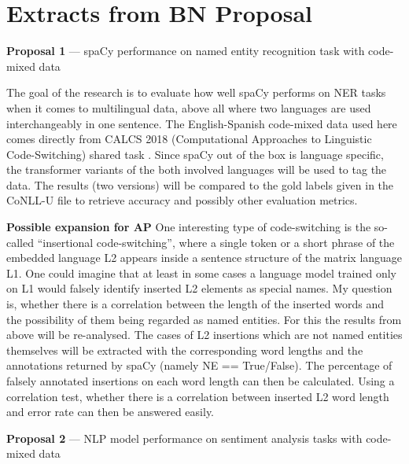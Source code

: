 \documentclass[11pt]{article}
\begin{document}
\newpage
\section{Extracts from BN Proposal}

\noindent \textbf{Proposal 1} --- spaCy performance on named entity recognition task with code-mixed data \bigbreak

The goal of the research is to evaluate how well spaCy performs on NER tasks when it comes to multilingual data, above all where two languages are used interchangeably in one sentence.  The English-Spanish code-mixed data used here comes directly from CALCS 2018 (Computational Approaches to Linguistic Code-Switching) shared task \citep{aguilaretal2018calcs}. Since spaCy out of the box is language specific, the transformer variants of the both involved languages will be used to tag the data. The results (two versions) will be compared to the gold labels given in the CoNLL-U file to retrieve accuracy and possibly other evaluation metrics.

\textbf{Possible expansion for AP} One interesting type of code-switching is the so-called ``insertional code-switching'', where a single token or a short phrase of the embedded language L2 appears inside a sentence structure of the matrix language L1. One could imagine that at least in some cases a language model trained only on L1 would falsely identify inserted L2 elements as special names. My question is, whether there is a correlation between the length of the inserted words and the possibility of them being regarded as named entities. For this the results from above will be re-analysed. The cases of L2 insertions which are not named entities themselves will be extracted with the corresponding word lengths and the annotations returned by spaCy (namely NE == True/False). The percentage of falsely annotated insertions on each word length can then be calculated. Using a correlation test, whether there is a correlation between inserted L2 word length and error rate can then be answered easily.
\vspace{20pt}

\noindent \textbf{Proposal 2} --- NLP model performance on sentiment analysis tasks with code-mixed data \bigbreak
\end{document}
